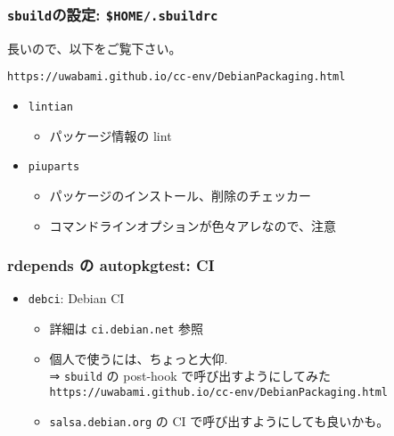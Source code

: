 \documentclass[cjk,dvipdfmx,14pt,compress,%
hyperref={bookmarks=true,bookmarksnumbered=true,bookmarksopen=false,%
colorlinks=false,%
pdftitle={第 134 回 関西 Debian 勉強会},%
pdfauthor={佐々木洋平},%
pdfsubject={資料},%
}]{beamer}
\begin{document}
\begin{frame}
  \frametitle{\texttt{sbuild}の設定: \texttt{\$HOME/.sbuildrc}}
  長いので、以下をご覧下さい。
  \begin{center}
    {\small{\texttt{https://uwabami.github.io/cc-env/DebianPackaging.html}}}
  \end{center}
  \begin{itemize}
  \item \texttt{lintian}
    \begin{itemize}
    \item %
      パッケージ情報の lint
    \end{itemize}
  \item \texttt{piuparts}
    \begin{itemize}
    \item %
      パッケージのインストール、削除のチェッカー
    \item %
      コマンドラインオプションが色々アレなので、注意
    \end{itemize}
  \end{itemize}
\end{frame}

\begin{frame}
  \frametitle{rdepends の autopkgtest: CI}
  \begin{itemize}
  \item \texttt{debci}: Debian CI
    \begin{itemize}
    \item 詳細は \texttt{ci.debian.net} 参照
    \item 個人で使うには、ちょっと大仰. \\
      ⇒ \texttt{sbuild} の post-hook で呼び出すようにしてみた\\
      {\footnotesize{\texttt{https://uwabami.github.io/cc-env/DebianPackaging.html}}}
    \item \texttt{salsa.debian.org} の CI で呼び出すようにしても良いかも。
    \end{itemize}
  \end{itemize}
\end{frame}


\end{document}
